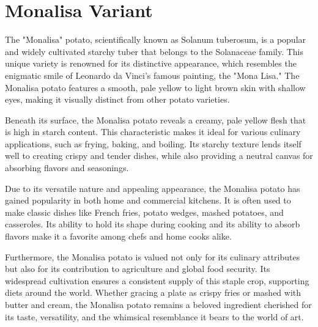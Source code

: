 \documentclass[../../../../main.tex]{subfiles}
\begin{document}

\onlyonsectionfile{
}




\section{Monalisa Variant}


The "Monalisa" potato, scientifically known as Solanum tuberosum, is a popular and widely cultivated starchy tuber that belongs to the Solanaceae family. This unique variety is renowned for its distinctive appearance, which resembles the enigmatic smile of Leonardo da Vinci's famous painting, the "Mona Lisa." The Monalisa potato features a smooth, pale yellow to light brown skin with shallow eyes, making it visually distinct from other potato varieties.

Beneath its surface, the Monalisa potato reveals a creamy, pale yellow flesh that is high in starch content. This characteristic makes it ideal for various culinary applications, such as frying, baking, and boiling. Its starchy texture lends itself well to creating crispy and tender dishes, while also providing a neutral canvas for absorbing flavors and seasonings.

Due to its versatile nature and appealing appearance, the Monalisa potato has gained popularity in both home and commercial kitchens. It is often used to make classic dishes like French fries, potato wedges, mashed potatoes, and casseroles. Its ability to hold its shape during cooking and its ability to absorb flavors make it a favorite among chefs and home cooks alike.

Furthermore, the Monalisa potato is valued not only for its culinary attributes but also for its contribution to agriculture and global food security. Its widespread cultivation ensures a consistent supply of this staple crop, supporting diets around the world. Whether gracing a plate as crispy fries or mashed with butter and cream, the Monalisa potato remains a beloved ingredient cherished for its taste, versatility, and the whimsical resemblance it bears to the world of art.
\end{document}
